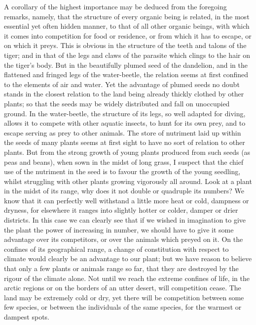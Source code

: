 A corollary of the highest importance may be deduced from the foregoing remarks, namely, that the structure of every organic being is related, in the most essential yet often hidden manner, to that of all other organic beings, with which it comes into competition for food or residence, or from which it has to escape, or on which it preys. This is obvious in the structure of the teeth and talons of the tiger; and in that of the legs and claws of the parasite which clings to the hair on the tiger's body. But in the beautifully plumed seed of the dandelion, and in the flattened and fringed legs of the water-beetle, the relation seems at first confined to the elements of air and water. Yet the advantage of plumed seeds no doubt stands in the closest relation to the land being already thickly clothed by other plants; so that the seeds may be widely distributed and fall on unoccupied ground. In the water-beetle, the structure of its legs, so well adapted for diving, allows it to compete with other aquatic insects, to hunt for its own prey, and to escape serving as prey to other animals.
The store of nutriment laid up within the seeds of many plants seems at first sight to have no sort of relation to other plants. But from the strong growth of young plants produced from such seeds (as peas and beans), when sown in the midst of long grass, I suspect that the chief use of the nutriment in the seed is to favour the growth of the young seedling, whilst struggling with other plants growing vigorously all around.
Look at a plant in the midst of its range, why does it not double or quadruple its numbers? We know that it can perfectly well withstand a little more heat or cold, dampness or dryness, for elsewhere it ranges into slightly hotter or colder, damper or drier districts. In this case we can clearly see that if we wished in imagination to give the plant the power of increasing in number, we should have to give it some advantage over its competitors, or over the animals which preyed on it. On the confines of its geographical range, a change of constitution with respect to climate would clearly be an advantage to our plant; but we have reason to believe that only a few plants or animals range so far, that they are destroyed by the rigour of the climate alone. Not until we reach the extreme confines of life, in the arctic regions or on the borders of an utter desert, will competition cease. The land may be extremely cold or dry, yet there will be competition between some few species, or between the individuals of the same species, for the warmest or dampest spots.

